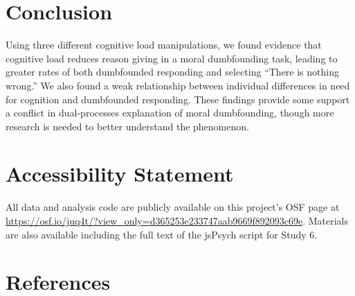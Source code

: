 \documentclass[
  american,
  man,floatsintext]{apa7}
\begin{document}
\hypertarget{conclusion}{%
\section{Conclusion}\label{conclusion}}

Using three different cognitive load manipulations, we found evidence that cognitive load reduces reason giving in a moral dumbfounding task, leading to greater rates of both dumbfounded responding and selecting ``There is nothing wrong.'' We also found a weak relationship between individual differences in need for cognition and dumbfounded responding. These findings provide some support a conflict in dual-processes explanation of moral dumbfounding, though more research is needed to better understand the phenomenon.

\hypertarget{accessibility-statement}{%
\section{Accessibility Statement}\label{accessibility-statement}}

All data and analysis code are publicly available on this project's OSF page at \url{https://osf.io/juq4t/?view_only=d365253e233747aab9669f892093c69e}. Materials are also available including the full text of the jsPsych script for Study 6.

\newpage

\hypertarget{references}{%
\section*{References}\label{references}}
\end{document}
